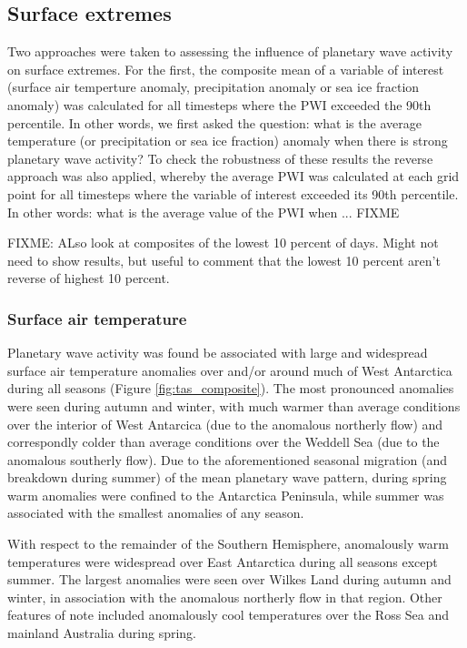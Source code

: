 \subsection{Surface extremes}

Two approaches were taken to assessing the influence of planetary wave activity on surface extremes. For the first, the composite mean of a variable of interest (surface air temperture anomaly, precipitation anomaly or sea ice fraction anomaly) was calculated for all timesteps where the PWI exceeded the 90th percentile. In other words, we first asked the question: what is the average temperature (or precipitation or sea ice fraction) anomaly when there is strong planetary wave activity? To check the robustness of these results the reverse approach was also applied, whereby the average PWI was calculated at each grid point for all timesteps where the variable of interest exceeded its 90th percentile. In other words: what is the average value of the PWI when ... FIXME

FIXME: ALso look at composites of the lowest 10 percent of days. Might not need to show results, but useful to comment that the lowest 10 percent aren't reverse of highest 10 percent.

\subsubsection{Surface air temperature}

Planetary wave activity was found be associated with large and widespread surface air temperature anomalies over and/or around much of West Antarctica during all seasons (Figure \ref{fig:tas_composite}). The most pronounced anomalies were seen during autumn and winter, with much warmer than average conditions over the interior of West Antarcica (due to the anomalous northerly flow) and correspondly colder than average conditions over the Weddell Sea (due to the anomalous southerly flow). Due to the aforementioned seasonal migration (and breakdown during summer) of the mean planetary wave pattern, during spring warm anomalies were confined to the Antarctica Peninsula, while summer was associated with the smallest anomalies of any season.  

With respect to the remainder of the Southern Hemisphere, anomalously warm temperatures were widespread over East Antarctica during all seasons except summer. The largest anomalies were seen over Wilkes Land during autumn and winter, in association with the anomalous northerly flow in that region. Other features of note included anomalously cool temperatures over the Ross Sea and mainland Australia during spring.

